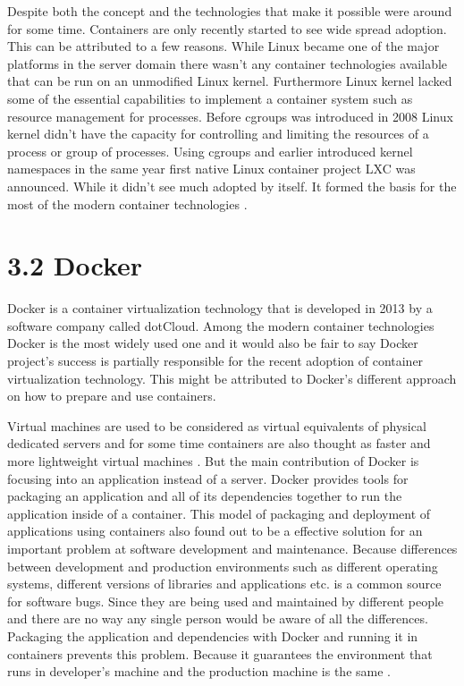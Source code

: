 \documentclass[12pt,oneandhalf,chaparabic,ceng,ms,eng,oneside,pntc]{gsufbe}
\begin{document}
Despite both the concept and the technologies that make it possible were around for some time.
Containers are only recently started to see wide spread adoption.  This can be attributed to a few
reasons.  While Linux became one of the major platforms in the server domain there wasn't any container
technologies available that can be run on an unmodified Linux kernel.  Furthermore Linux kernel lacked
some of the essential capabilities to implement a container system such as resource management for
processes.  Before cgroups was introduced in 2008 Linux kernel didn't have the capacity for controlling
and limiting the resources of a process or group of processes.  Using cgroups and earlier introduced
kernel namespaces in the same year first native Linux
container project LXC \cite{lxc} was announced.  While it didn't see much adopted by itself.  It formed
the basis
for the most of the modern container technologies \cite{singh_containers_2016}.

\section[Docker]{3.2 Docker}
Docker is a container virtualization technology \cite{docker} that is developed in 2013 by a software
company called
dotCloud.  Among the modern container technologies Docker is the most widely used one and it would also
be fair to say Docker project's success is partially responsible for the recent adoption of container
virtualization technology.  This might be attributed to Docker's different approach on how to prepare 
and use containers.

Virtual machines are used to be considered as virtual equivalents of physical dedicated servers and for
some time containers are also thought as faster and more lightweight virtual machines
\cite{adufu_is_2015}.  But the main
contribution of Docker is focusing into an application instead of a server.  Docker provides tools for
packaging an application and all of its dependencies together to run the application inside of a
container.  This model of packaging and deployment of applications using containers also found out to be
a effective solution for an important problem at software development and maintenance.  Because 
differences between development and production environments such as different operating systems, 
different versions of libraries and applications etc. is a common source for software bugs.  Since they
are being used and  maintained by different people and there are no way any single person would be
aware of all the differences.  Packaging the application and dependencies with Docker and running it in
containers prevents this problem.  Because it guarantees the environment that runs in developer’s
machine and the production machine is the same \cite{boettiger_introduction_2015}.
\end{document}
